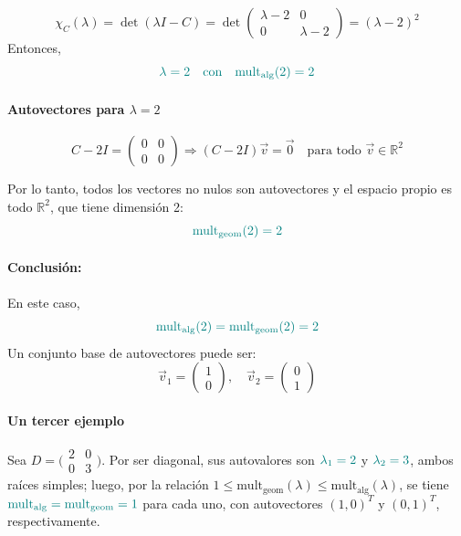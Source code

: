 \documentclass{article}
\newcommand{\vect}[1]{\vec{#1}}
\begin{document}
\[
\chi_C(\lambda) = \det(\lambda I - C)
= \det\begin{pmatrix}
\lambda-2 & 0\\
0 & \lambda-2
\end{pmatrix}
= (\lambda - 2)^2
\]
Entonces,
\[
\color{teal}
\lambda = 2 \quad \text{con} \quad \mathrm{mult}_{\mathrm{alg}}(2) = 2
\]

\paragraph*{Autovectores para \(\lambda=2\)}

\[
C - 2I = \begin{pmatrix}
0 & 0\\
0 & 0
\end{pmatrix}
\Rightarrow
(C - 2I)\vect{v} = \vect{0} \quad \text{para todo } \vect{v}\in\mathbb{R}^2
\]

Por lo tanto, todos los vectores no nulos son autovectores y el espacio propio es todo \(\mathbb{R}^2\), que tiene dimensión 2:
\[
\color{teal}
\mathrm{mult}_{\mathrm{geom}}(2) = 2
\]

\paragraph*{Conclusión:}
En este caso,
\[
\color{teal}
\mathrm{mult}_{\mathrm{alg}}(2) = \mathrm{mult}_{\mathrm{geom}}(2) = 2
\]
Un conjunto base de autovectores puede ser:
\[
\vect{v}_1 = \begin{pmatrix}1\\0\end{pmatrix},
\quad
\vect{v}_2 = \begin{pmatrix}0\\1\end{pmatrix}
\]

\paragraph*{Un tercer ejemplo}
Sea \(D=\bigl(\begin{smallmatrix}2&0\\0&3\end{smallmatrix}\bigr)\). Por ser diagonal, sus autovalores son \(\color{teal}\lambda_1=2\) y \(\color{teal}\lambda_2=3\), ambos raíces simples; luego, por la relación \(1\le\mathrm{mult}_{\mathrm{geom}}(\lambda)\le\mathrm{mult}_{\mathrm{alg}}(\lambda)\), se tiene \(\color{teal}\mathrm{mult}_{\mathrm{alg}}=\mathrm{mult}_{\mathrm{geom}}=1\) para cada uno, con autovectores \((1,0)^T\) y \((0,1)^T\), respectivamente.
\end{document}

